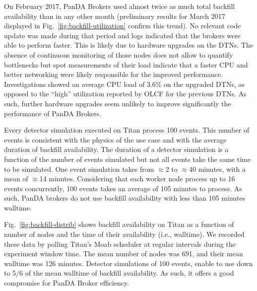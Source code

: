 On February 2017, PanDA Brokers used almost twice as much total backfill
availability than in any other month (preliminary results for March 2017
displayed in Fig.~\ref{fig:backfill-utilization} confirm this trend). No
relevant code update was made during that period and logs indicated that the
brokers were able to perform faster. This is likely due to hardware upgrades
on the DTNs. The absence of continuous monitoring of those nodes does not
allow to quantify bottlenecks but spot measurements of their load indicate
that a faster CPU and better networking were likely responsible for the
improved performance. Investigations showed an average CPU load of 3.6\% on
the upgraded DTNs, as opposed to the ``high'' utilization reported by OLCF
for the previous DTNs. As such, further hardware upgrades seem unlikely to
improve significantly the performance of PanDA Brokers.

Every detector simulation executed on Titan process 100 events. This number
of events is consistent with the physics of the use case and with the average
duration of backfill availability. The duration of a detector simulation is a
function of the number of events simulated but not all events take the same
time to be simulated. One event simulation takes from \(\approx\)2 to
\(\approx\)40 minutes, with a mean of \(\approx\)14 minutes. Considering that
each worker node process up to 16 events concurrently, 100 events takes an
average of 105 minutes to process. As such, PanDA brokers do not use backfill
availability with less than 105 minutes walltime.

Fig.~\ref{fig:backfill-distrib} shows backfill availability on Titan as a
function of number of nodes and the time of their availability (i.e.,
walltime). We recorded these data by polling Titan's Moab scheduler at
regular intervals during the experiment window time. The mean number of nodes
was 691, and their mean walltime was 126 minutes. Detector simulations of 100
events, enable to use down to 5/6 of the mean walltime of backfill
availability. As such, it offers a good compromise for PanDA Broker
efficiency.

